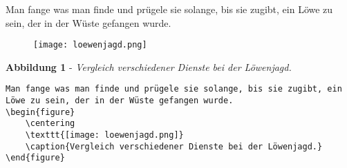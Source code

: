 \begin{frame}[fragile]
	\Losung
	\begin{outputbox}
		Man fange was man finde und prügele sie solange, bis sie zugibt, ein Löwe zu sein, der in der Wüste gefangen wurde.
		\begin{figure}
			\centering
			\texttt{[image: loewenjagd.png]}
		\end{figure}
		\begin{center}
			\textbf{Abbildung 1} - \textit{Vergleich verschiedener Dienste bei der Löwenjagd.}
		\end{center}
	\end{outputbox}

	\Code
	\begin{lstlisting}
Man fange was man finde und prügele sie solange, bis sie zugibt, ein Löwe zu sein, der in der Wüste gefangen wurde.
\begin{figure}
	\centering
	\texttt{[image: loewenjagd.png]}
	\caption{Vergleich verschiedener Dienste bei der Löwenjagd.}
\end{figure}
	\end{lstlisting}
\end{frame}